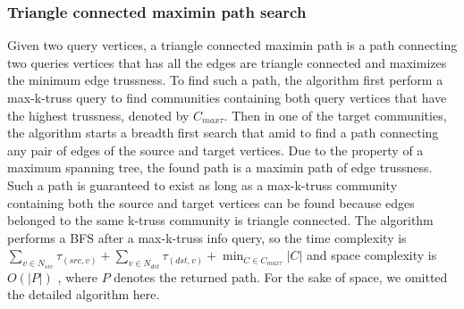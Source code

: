 \subsubsection{Triangle connected maximin path search}
\label{path search}

Given two query vertices, a triangle connected maximin path is a path connecting two queries vertices that has all the edges are triangle connected and maximizes the minimum edge trussness. To find such a path, the algorithm first perform a max-k-truss \toplevelprob{} query to find communities containing both query vertices that have the highest trussness, denoted by $C_{max\tau}$. Then in one of the target communities, the algorithm starts a breadth first search that amid to find a path connecting any pair of edges of the source and target vertices. Due to the property of a maximum spanning tree, the found path is a maximin path of edge trussness. Such a path is guaranteed to exist as long as a max-k-truss community containing both the source and target vertices can be found because edges belonged to the same k-truss community is triangle connected. The algorithm performs a BFS after a max-k-truss info query, so the time complexity is $\sum_{v \in N_{src}}{\tau_{(src,v)}} + \sum_{v \in N_{dst}}{\tau_{(dst,v)}} + \min_{C \in C_{max\tau}}{|C|}$ and space complexity is $O(|P|)$ , where $P$ denotes the returned path. For the sake of space, we omitted the detailed algorithm here.
